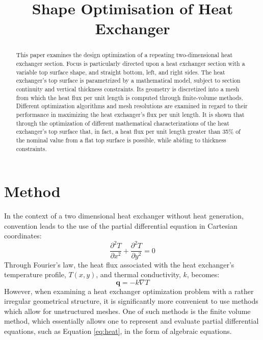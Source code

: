 \documentclass{article}
\title{Shape Optimisation of Heat Exchanger}
\begin{document}
\maketitle

\begin{abstract}
    This paper examines the design optimization of a repeating two-dimensional heat exchanger section. Focus is particularly directed upon a heat exchanger section with a variable top surface shape, and straight bottom, left, and right sides. The heat exchanger's top surface is parametrized by a mathematical model, subject to section continuity and vertical thickness constraints. Its geometry is discretized into a mesh from which the heat flux per unit length is computed through finite-volume methods. Different optimization algorithms and mesh resolutions are examined in regard to their performance in maximizing the heat exchanger's flux per unit length. It is shown that through the optimization of different mathematical characterizations of the heat exchanger's top surface that, in fact, a heat flux per unit length greater than 35\% of the nominal value from a flat top surface is possible, while abiding to thickness constraints.
\end{abstract}

\tableofcontents
\listoftables
\listoffigures
\lstlistoflistings

\section{Method}
In the context of a two dimensional heat exchanger without heat generation, convention leads to the use of the partial differential equation in Cartesian coordinates:
\begin{equation}
    \frac{\partial^2 T}{\partial x^2} + \frac{\partial^2 T}{\partial y^2} =0
    \label{eq:heat}
\end{equation}
Through Fourier's law, the heat flux associated with the heat exchanger's temperature profile, $T(x,y)$, and thermal conductivity, $k$, becomes:
\begin{equation}
    \mathbf{q} = -k \nabla T
\end{equation}
However, when examining a heat exchanger optimization problem with a rather irregular geometrical structure, it is significantly more convenient to use methods which allow for unstructured meshes. One of such methods is the finite volume method, which essentially allows one to represent and evaluate partial differential equations, such as Equation \ref{eq:heat}, in the form of algebraic equations.
\end{document}
